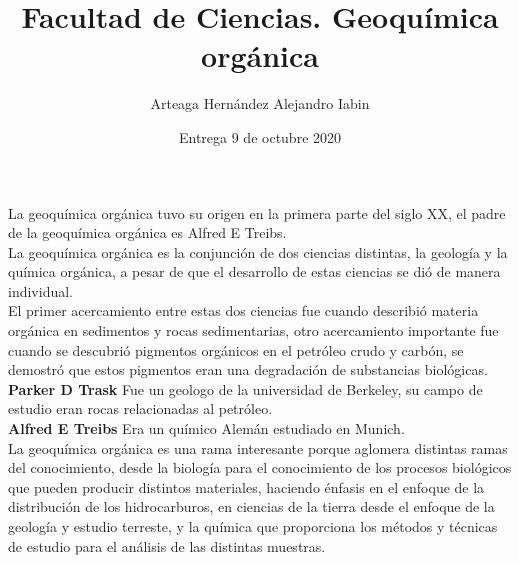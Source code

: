 \documentclass{article}
\title{Facultad de Ciencias. Geoquímica orgánica}
\author{Arteaga Hernández Alejandro Iabin }
\date{Entrega 9 de octubre 2020}
\begin{document}
\maketitle

La geoquímica orgánica tuvo su origen en la primera parte del siglo XX, el padre de la geoquímica orgánica
es Alfred E Treibs.
\\

La geoquímica orgánica es la conjunción de dos ciencias distintas, la geología y la química orgánica,
a pesar de que el desarrollo de estas ciencias se dió de manera individual.
\\



El primer acercamiento entre estas dos ciencias fue cuando describió materia orgánica en sedimentos y 
rocas sedimentarias, otro acercamiento importante fue cuando se descubrió pigmentos orgánicos en el petróleo crudo y carbón, se demostró que estos pigmentos eran una degradación de substancias biológicas.
\\


\textbf{Parker D Trask}
Fue un geologo de la universidad de Berkeley, su campo de estudio eran rocas relacionadas al petróleo.
\\


\textbf{Alfred E Treibs}
Era un químico Alemán estudiado en Munich.
\\


La geoquímica orgánica es una rama interesante porque aglomera distintas ramas del conocimiento, 
desde la biología para el conocimiento de los procesos biológicos que pueden producir distintos materiales,
haciendo énfasis en el enfoque de la distribución de los hidrocarburos, en ciencias de la tierra desde el enfoque de la geología y estudio terreste, y la química que proporciona los métodos y técnicas de estudio
para el análisis de las distintas muestras.
\end{document}
